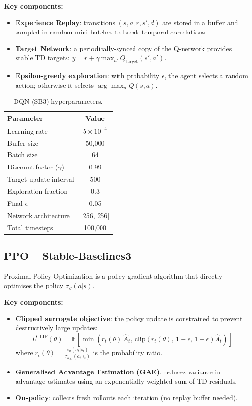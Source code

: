 \documentclass[11pt,a4paper]{article}
\begin{document}
\textbf{Key components:}
\begin{itemize}[nosep]
    \item \textbf{Experience Replay}: transitions $(s, a, r, s', d)$ are stored in a buffer and sampled in random mini-batches to break temporal correlations.
    \item \textbf{Target Network}: a periodically-synced copy of the Q-network provides stable TD targets: $y = r + \gamma \max_{a'} Q_{\text{target}}(s', a')$.
    \item \textbf{Epsilon-greedy exploration}: with probability $\epsilon$, the agent selects a random action; otherwise it selects $\arg\max_a Q(s, a)$.
\end{itemize}

\begin{table}[H]
\centering
\begin{tabular}{lc}
\toprule
\textbf{Parameter} & \textbf{Value} \\
\midrule
Learning rate & $5 \times 10^{-4}$ \\
Buffer size & 50,000 \\
Batch size & 64 \\
Discount factor ($\gamma$) & 0.99 \\
Target update interval & 500 \\
Exploration fraction & 0.3 \\
Final $\epsilon$ & 0.05 \\
Network architecture & [256, 256] \\
Total timesteps & 100,000 \\
\bottomrule
\end{tabular}
\caption{DQN (SB3) hyperparameters.}
\end{table}

\subsection{PPO -- Stable-Baselines3}

Proximal Policy Optimization \cite{schulman2017} is a policy-gradient algorithm that directly optimises the policy $\pi_\theta(a|s)$.

\textbf{Key components:}
\begin{itemize}[nosep]
    \item \textbf{Clipped surrogate objective}: the policy update is constrained to prevent destructively large updates:
    \[
    L^{\text{CLIP}}(\theta) = \mathbb{E}\!\left[\min\!\left(r_t(\theta)\,\hat{A}_t,\ \text{clip}\!\left(r_t(\theta),\, 1{-}\epsilon,\, 1{+}\epsilon\right)\hat{A}_t\right)\right]
    \]
    where $r_t(\theta) = \frac{\pi_\theta(a_t|s_t)}{\pi_{\theta_{\text{old}}}(a_t|s_t)}$ is the probability ratio.
    \item \textbf{Generalised Advantage Estimation (GAE)}: reduces variance in advantage estimates using an exponentially-weighted sum of TD residuals.
    \item \textbf{On-policy}: collects fresh rollouts each iteration (no replay buffer needed).
\end{itemize}
\end{document}
